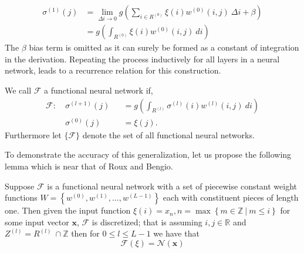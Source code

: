 \begin{equation}
\begin{aligned}
    \sigma^{(1)}(j) &= \lim_{\Delta i \to 0}g\left(\sum_{i\in R^{(0)}} \xi(i) w^{(0)}(i,j)\ \Delta i + \beta\right) \\
    &= g\left(\int_{R^{(0)}} \xi(i) w^{(0)}(i,j)\ di\right)
\end{aligned}
\end{equation}
The $\beta$ bias term is omitted as it can surely be formed as a constant of integration in the derivation.
Repeating the process inductively for all layers in a neural network, leads to a recurrence relation for this construction. 
\begin{definition}
We call $\mathcal{F}$ a functional neural network if,
\begin{equation}
          \begin{alignedat}{2}
        \mathcal{F}:\ &\sigma^{(l+1)}(j) & &=  g\left(\int_{R^{(l)}} \sigma^{(l)}(i) w^{(l)}(i,j)\ di \right)  \\
        &\sigma^{(0)}(j) & &= \xi(j). 
        \end{alignedat}
\end{equation}
Furthermore let $\{\mathcal{F}\}$ denote the set of all functional neural networks.
\end{definition}
To demonstrate the accuracy of this generalization, let us propose the following lemma which is near that of Roux and Bengio.
\begin{theorem} Suppose $\mathcal{F}$ is a functional neural network with a set of piecewise constant weight functions $W = \left\{w^{(0)}, w^{(1)}, \dots, w^{(L-1)}\right\}$ each with constituent pieces of length one. Then given the input function $\xi(i) = x_n, n = \max\left\{m\in \mathbb{Z}\ |\ m\leq i\right\}$ for some input vector $\pmb{x}$, $\mathcal{F}$ is discretized; that is assuming $i,j \in \mathbb{R}$ and $Z^{(l)} = R^{(l)}\ \cap \mathbb{Z}$ then for $0 \leq l \leq L-1$ we have that
\begin{equation}\mathcal{F}(\xi)= \mathcal{N}(\pmb{x})\end{equation}
\end{theorem}
